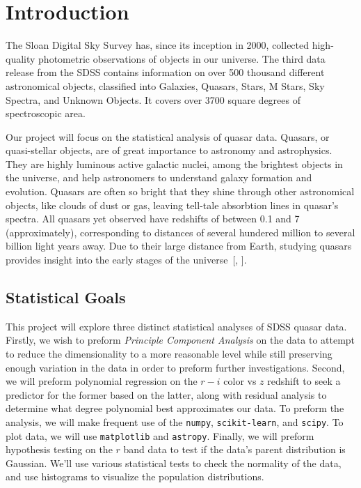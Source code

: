 \chapter{Introduction}

The Sloan Digital Sky Survey has, since its inception in 2000, collected high-quality photometric observations of objects in our universe. The third data release from the SDSS contains information on over 500 thousand different astronomical objects, classified into Galaxies, Quasars, Stars, M Stars, Sky Spectra, and Unknown Objects. It covers over 3700 square degrees of spectroscopic area.

Our project will focus on the statistical analysis of quasar data. Quasars, or quasi-stellar objects, are of great importance to astronomy and astrophysics. They are highly luminous active galactic nuclei, among the brightest objects in the universe, and help astronomers to understand galaxy formation and evolution. Quasars are often so bright that they shine through other astronomical objects, like clouds of dust or gas, leaving tell-tale absorbtion lines in quasar's spectra. All quasars yet observed have redshifts of between 0.1 and 7 (approximately), corresponding to distances of several hundered million to several billion light years away. Due to their large distance from Earth, studying quasars provides insight into the early stages of the universe~[\cite{starchild}, \cite{skyserver}].

\section{Statistical Goals}
This project will explore three distinct statistical analyses of SDSS quasar data. Firstly, we wish to preform \emph{Principle Component Analysis} on the data to attempt to reduce the dimensionality to a more reasonable level while still preserving enough variation in the data in order to preform further investigations. Second, we will preform polynomial regression on the $r-i$ color vs $z$ redshift to seek a predictor for the former based on the latter, along with residual analysis to determine what degree polynomial best approximates our data. To preform the analysis, we will make frequent use of the \texttt{numpy}, \texttt{scikit-learn}, and \texttt{scipy}. To plot data, we will use \texttt{matplotlib} and \texttt{astropy}. Finally, we will preform hypothesis testing on the $r$ band data to test if the data's parent distribution is Gaussian. We'll use various statistical tests to check the normality of the data, and use histograms to visualize the population distributions.

